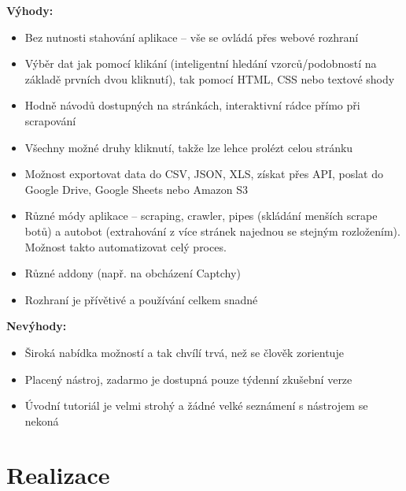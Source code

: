 \documentclass[thesis=B,czech]{FITthesis}[2012/06/26]
\begin{document}
\textbf{Výhody:}
\begin{itemize}
	\item Bez nutnosti stahování aplikace -- vše se ovládá přes webové rozhraní
	\item Výběr dat jak pomocí klikání (inteligentní hledání vzorců/podobností na základě prvních dvou kliknutí), tak pomocí HTML, CSS nebo textové shody
	\item Hodně návodů dostupných na stránkách, interaktivní rádce přímo při scrapování
	\item Všechny možné druhy kliknutí, takže lze lehce prolézt celou stránku
	\item Možnost exportovat data do CSV, JSON, XLS, získat přes API, poslat do Google Drive, Google Sheets nebo Amazon S3
	\item Různé módy aplikace -- scraping, crawler, pipes (skládání menších scrape botů) a autobot (extrahování z více stránek najednou se stejným rozložením). Možnost takto automatizovat celý proces.
	\item Různé addony (např. na obcházení Captchy)
	\item Rozhraní je přívětivé a používání celkem snadné
\end{itemize}

\textbf{Nevýhody:}
\begin{itemize}
	\item Široká nabídka možností a tak chvílí trvá, než se člověk zorientuje
	\item Placený nástroj, zadarmo je dostupná pouze týdenní zkušební verze
	\item Úvodní tutoriál je velmi strohý a žádné velké seznámení s nástrojem se nekoná
\end{itemize}


\chapter{Realizace}


\begin{conclusion}
\end{conclusion}




\appendix
\end{document}
